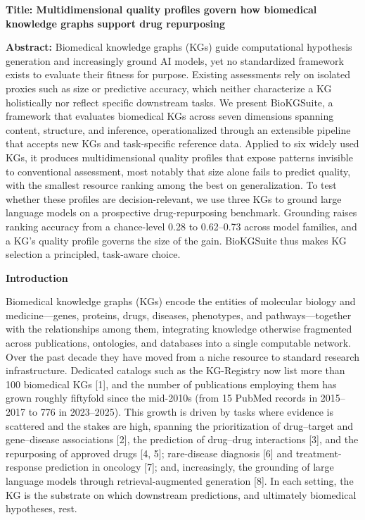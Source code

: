 \textbf{Title: Multidimensional quality profiles govern how biomedical knowledge graphs support drug repurposing}

\textbf{Abstract:} Biomedical knowledge graphs (KGs) guide computational hypothesis generation and increasingly ground AI models, yet no standardized framework exists to evaluate their fitness for purpose. Existing assessments rely on isolated proxies such as size or predictive accuracy, which neither characterize a KG holistically nor reflect specific downstream tasks. We present BioKGSuite, a framework that evaluates biomedical KGs across seven dimensions spanning content, structure, and inference, operationalized through an extensible pipeline that accepts new KGs and task-specific reference data. Applied to six widely used KGs, it produces multidimensional quality profiles that expose patterns invisible to conventional assessment, most notably that size alone fails to predict quality, with the smallest resource ranking among the best on generalization. To test whether these profiles are decision-relevant, we use three KGs to ground large language models on a prospective drug-repurposing benchmark. Grounding raises ranking accuracy from a chance-level 0.28 to 0.62--0.73 across model families, and a KG's quality profile governs the size of the gain. BioKGSuite thus makes KG selection a principled, task-aware choice.

\textbf{Introduction}

Biomedical knowledge graphs (KGs) encode the entities of molecular biology and medicine---genes, proteins, drugs, diseases, phenotypes, and pathways---together with the relationships among them, integrating knowledge otherwise fragmented across publications, ontologies, and databases into a single computable network. Over the past decade they have moved from a niche resource to standard research infrastructure. Dedicated catalogs such as the KG-Registry now list more than 100 biomedical KGs {[}1{]}, and the number of publications employing them has grown roughly fiftyfold since the mid-2010s (from 15 PubMed records in 2015--2017 to 776 in 2023--2025). This growth is driven by tasks where evidence is scattered and the stakes are high, spanning the prioritization of drug--target and gene--disease associations {[}2{]}, the prediction of drug--drug interactions {[}3{]}, and the repurposing of approved drugs {[}4, 5{]}; rare-disease diagnosis {[}6{]} and treatment-response prediction in oncology {[}7{]}; and, increasingly, the grounding of large language models through retrieval-augmented generation {[}8{]}. In each setting, the KG is the substrate on which downstream predictions, and ultimately biomedical hypotheses, rest.

